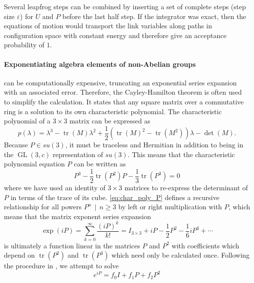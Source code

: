 \documentclass[a4paper,10pt]{article}
\begin{document}
Several leapfrog steps can be combined by inserting a set of complete steps (step size $\varepsilon$) for $U$ and $P$ before the last half step. If the integrator was exact, then the equations of motion would transport the link variables along paths in configuration space with constant energy and therefore give an acceptance probability of $1$. \paragraph{Exponentiating algebra elements of non-Abelian groups} can be computationally expensive, truncating an exponential series expansion with an associated error. Therefore, the Cayley-Hamilton theorem is often used to simplify the calculation. It states that any square matrix over a commutative ring is a solution to its own characteristic polynomial. The characteristic polynomial of a $3\times3$ matrix can be expressed as
\begin{equation}
p(\lambda)=\lambda^{3}-\operatorname{tr}(M) \lambda^{2}+\frac{1}{2}\left(\operatorname{tr}(M)^{2}-\operatorname{tr}\left(M^{2}\right)\right) \lambda-\operatorname{det}(M).
\end{equation}
Because $P \in su(3)$, it must be traceless and Hermitian in addition to being in the $ \operatorname{GL}(3,c)$ representation of $su(3)$. This means that the characteristic polynomial equation $P$ can be written as
\begin{equation}\label{eq:char_poly_P}
P^{3}-\frac{1}{2}\operatorname{tr}\left(P^{2}\right)P-\frac{1}{3}\operatorname{tr}(P^3) = 0
\end{equation}
where we have used an identity of $3\times3$ matrices to re-express the determinant of $P$ in terms of the trace of its cube. \eqref{eq:char_poly_P} defines a recursive relationship for all powers $P^n\,\mid\,n\geq3$ by left or right multiplication with $P$, which means that the matrix exponent series expansion 
\begin{equation}
\exp (iP)=\sum_{k=0}^{\infty} \frac{(iP)^{k}}{k !}=I_{3\times3}+iP-\frac{1}{2} P^{2}-\frac{1}{6}i P^{3}+\cdots
\end{equation}
is ultimately a function linear in the matrices $P$ and $P^2$ with coefficients which depend on $\operatorname{tr}(P^2)$ and $\operatorname{tr}(P^3)$ which need only be calculated once. Following the procedure in \cite{morningstar2004analytic}, we attempt to solve 
\begin{equation}\label{eq:Cay_ham_eq}
e^{i P}=f_{0} I+f_{1} P+f_{2} P^{2} 
\end{equation}
\end{document}
